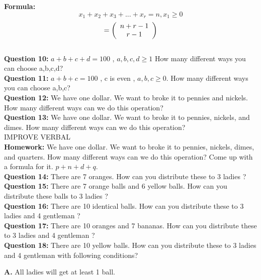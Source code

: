 \documentclass[11pt]{article}
\begin{document}
\textbf{Formula: } $$x_1 + x_2 + x_3 + ... + x_r = n , x_1 \geq 0$$ $$= \left( {\begin{array}{*{20}c} n+r-1 \\ r-1 \\ \end{array}} \right)$$
\\

\textbf{Question 10: }  $a+b+c+d = 100$ , $a,b,c,d \geq 1$ How many different ways you can choose a,b,c,d?
\\ %

\textbf{Question 11: }  $a+b+c = 100$ , c is even , $a,b,c \geq 0$. How many different ways you can choose a,b,c?
\\ %

\textbf{Question 12: }  We have one dollar. We want to broke it to pennies and nickels. How many different ways can we do this operation?
\\ %

\textbf{Question 13: }  We have one dollar. We want to broke it to pennies, nickels, and dimes. How many different ways can we do this operation?
\\ %

IMPROVE VERBAL
\\

\textbf{Homework: } We have one dollar. We want to broke it to pennies, nickels, dimes, and quarters. How many different ways can we do this operation? Come up with a formula for it. $p+n+d+q$.
\\ %

\textbf{Question 14: }  There are 7 oranges. How can you distribute these to 3 ladies ?
\\ %

\textbf{Question 15: }  There are 7 orange balls and 6 yellow balls. How can you distribute these balls to 3 ladies ?
\\ %

\textbf{Question 16: }  There are 10 identical balls. How can you distribute these to 3 ladies and 4 gentleman ?
\\ %

\textbf{Question 17: }  There are 10 oranges and 7 bananas. How can you distribute these to 3 ladies and 4 gentleman ?
\\ %

\textbf{Question 18: }  There are 10 yellow balls. How can you distribute these to 3 ladies and 4 gentleman with following conditions?
\par %
\textbf{A.} All ladies will get at least 1 ball.
\end{document}

